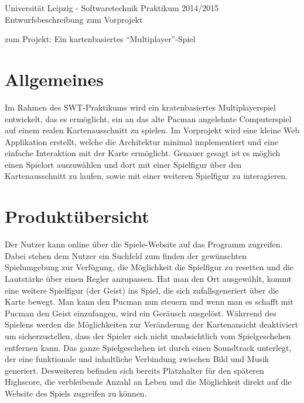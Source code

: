 \documentclass[11pt,a4paper]{article}
\begin{document}
\center \large Universität Leipzig - Softwaretechnik Praktikum 2014/2015\\
\center \Huge Entwurfsbeschreibung zum Vorprojekt \\
\par\bigskip

\small zum Projekt: Ein kartenbasiertes “Multiplayer”-Spiel

\par\bigskip

\tableofcontents

\clearpage

\flushleft
\section{Allgemeines}
Im Rahmen des SWT-Praktikums wird ein kratenbasiertes Multiplayerspiel entwickelt, das es ermöglicht, ein an das alte Pacman angelehnte Computerspiel auf einem realen Kartenausschnitt zu spielen.
Im Vorprojekt wird eine kleine Web Applikation erstellt, welche die Architektur minimal implementiert und eine einfache Interaktion mit der Karte ermöglicht.
Genauer gesagt ist es möglich einen Spielort auszuwählen und dort mit einer Spielfigur über den Kartenausschnitt zu laufen, sowie mit einer weiteren Spielfigur zu interagieren.

\section{Produktübersicht}
Der Nutzer kann online über die Spiele-Website auf das Programm zugreifen.
Dabei stehen dem Nutzer ein Suchfeld zum finden der gewünschten Spielumgebung zur Verfügung, die Möglichkeit die Spielfigur zu resetten und die Lautstärke über einen Regler anzupassen.
Hat man den Ort ausgewählt, kommt eine weitere Spielfigur (der Geist) ins Spiel, die sich zufallsgeneriert über die Karte bewegt.
Man kann den Pucman nun steuern und wenn man es schafft mit Pucman den Geist einzufangen, wird ein Geräusch ausgelöst.
Währrend des Spielens werden die Möglichkeiten zur Veränderung der Kartenansicht deaktiviert um sicherzustellen, dass der Spieler sich nicht unabsichtlich vom Spielgeschehen entfernen kann.
Das ganze Spielgeschehen ist durch einen Soundtrack unterlegt, der eine  funktionale und inhaltliche Verbindung zwischen Bild und Musik  generiert.
Desweiteren befinden sich bereits Platzhalter für den späteren Highscore, die verbleibende Anzahl an Leben und die Möglichkeit direkt auf die Website des Spiels zugreifen zu können.
\end{document}
